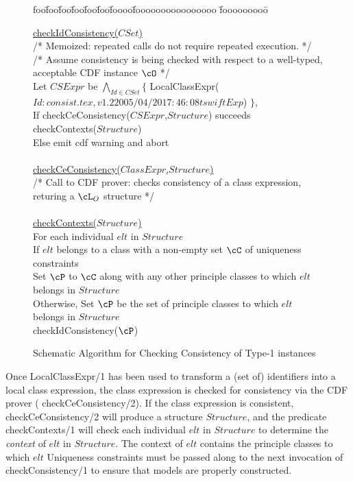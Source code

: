 \begin{figure}[htbp]
\longline
{\sf
\begin{tabbing}
foo\=foo\=foo\=foo\=foo\=foo\=foooo\=foooooooooooooooo \=fooooooooo\=\kill

\> \underline{checkIdConsistency($CSet$)}  \\
\> \> 	{\rm /* Memoized: repeated calls do
		not require repeated execution.  */ }\\
\> \> 	{\rm /* Assume consistency is being checked with respect to a
		well-typed, acceptable CDF instance $\cO$ */} \\
\> \> 	Let $CSExpr$ be $\bigwedge_{Id \in CSet} \{$ 
			LocalClassExpr($Id: consist.tex,v 1.2 2005/04/20 17:46:08 tswift Exp $) $\}$,  \\
\> \> 	If checkCeConsistency($CSExpr$,$Structure$) succeeds  \\
\> \> \> 	    checkContexts($Structure$) \\
\> \>     Else emit cdf warning and abort \\
\\
\> \underline{checkCeConsistency($ClassExpr$,$Structure$)} \\
\> \> {\rm /*  Call to CDF prover: checks consistency of a class
	         expression, returing a $\cL_O$ structure */} \\
\\
\> \underline{checkContexts($Structure$)}  \\
\> \> For each individual $elt$ in $Structure$ \\
\> \> \> If $elt$ belongs to a class with a non-empty set $\cC$ of
			uniqueness constraints \\
\> \> \> \> Set $\cP$ to $\cC$ along with any other principle classes to
		which  $elt$ belongs in $Structure$ \\ 
\> \> \> Otherwise, Set $\cP$ be the set of 
		principle classes to which $elt$ belongs in $Structure$ \\ 
\> \> \> checkIdConsistency($\cP$) \\
\end{tabbing}
}
\caption{Schematic Algorithm for Checking Consistency of Type-1 instances}
\label{fig:type1cc}
\longline
\end{figure}

Once {\sf LocalClassExpr/1} has been used to transform a (set of)
identifiers into a local class expression, the class expression is
checked for consistency via the CDF prover ({\sf
checkCeConsistency/2}).  If the class expression is consistent, {\sf
checkCeConsistency/2} will produce a structure $Structure$, and the
predicate {\sf checkContexts/1} will check each individual $elt$ in
$Structure$ to determine the {\em context} of $elt$ in $Structure$.
The context of $elt$ contains the principle classes to which $elt$
Uniqueness constraints must be passed along to the next invocation of
{\sf checkConsistency/1} to ensure that models are properly
constructed.

